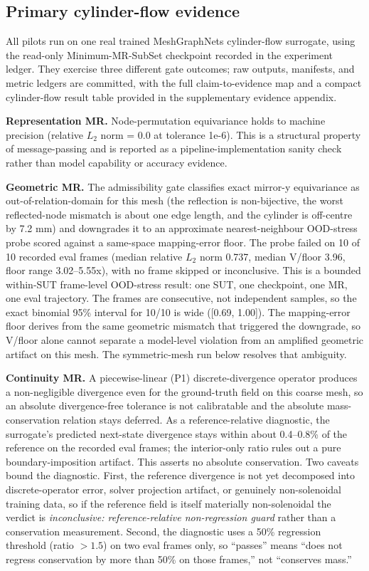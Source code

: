 \documentclass[preprint,12pt,authoryear]{elsarticle}
\begin{document}
\subsection{Primary cylinder-flow evidence}
\label{subsec:within-sut-pilot}

All pilots run on one real trained MeshGraphNets cylinder-flow surrogate, using the read-only Minimum-MR-SubSet checkpoint recorded in the experiment ledger. They exercise three different gate outcomes; raw outputs, manifests, and metric ledgers are committed, with the full claim-to-evidence map and a compact cylinder-flow result table provided in the supplementary evidence appendix.

\textbf{Representation MR.} Node-permutation equivariance holds to machine precision (relative \(L_2\) norm = 0.0 at tolerance 1e-6). This is a structural property of message-passing and is reported as a pipeline-implementation sanity check rather than model capability or accuracy evidence.

\textbf{Geometric MR.} The admissibility gate classifies exact mirror-y equivariance as out-of-relation-domain for this mesh (the reflection is non-bijective, the worst reflected-node mismatch is about one edge length, and the cylinder is off-centre by 7.2 mm) and downgrades it to an approximate nearest-neighbour OOD-stress probe scored against a same-space mapping-error floor. The probe failed on 10 of 10 recorded eval frames (median relative \(L_2\) norm 0.737, median V/floor 3.96, floor range 3.02--5.55x), with no frame skipped or inconclusive. This is a bounded within-SUT frame-level OOD-stress result: one SUT, one checkpoint, one MR, one eval trajectory. The frames are consecutive, not independent samples, so the exact binomial 95\% interval for 10/10 is wide ([0.69, 1.00]). The mapping-error floor derives from the same geometric mismatch that triggered the downgrade, so V/floor alone cannot separate a model-level violation from an amplified geometric artifact on this mesh. The symmetric-mesh run below resolves that ambiguity.

\textbf{Continuity MR.} A piecewise-linear (P1) discrete-divergence operator produces a non-negligible divergence even for the ground-truth field on this coarse mesh, so an absolute divergence-free tolerance is not calibratable and the absolute mass-conservation relation stays deferred. As a reference-relative diagnostic, the surrogate's predicted next-state divergence stays within about 0.4--0.8\% of the reference on the recorded eval frames; the interior-only ratio rules out a pure boundary-imposition artifact. This asserts no absolute conservation. Two caveats bound the diagnostic. First, the reference divergence is not yet decomposed into discrete-operator error, solver projection artifact, or genuinely non-solenoidal training data, so if the reference field is itself materially non-solenoidal the verdict is \emph{inconclusive: reference-relative non-regression guard} rather than a conservation measurement. Second, the diagnostic uses a 50\% regression threshold (ratio $>1.5$) on two eval frames only, so ``passes'' means ``does not regress conservation by more than 50\% on those frames,'' not ``conserves mass.''
\end{document}
